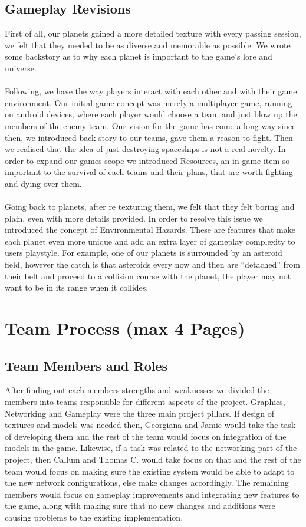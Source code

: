 \documentclass[11pt,a4paper]{article}
\begin{document}
        \subsection{Gameplay Revisions}
        First of all, our planets gained a more detailed texture with every passing session, we felt that they needed to be as diverse and memorable as possible. We wrote some backstory as to why each planet is important to the game's lore and universe. \\ \\ 
        Following, we have the way players interact with each other and with their game environment. Our initial game concept was merely a multiplayer game, running on android devices, where each player would choose a team and just blow up the members of the enemy team. Our vision for the game has come a long way since then, we introduced back story to our teams, gave them a reason to fight. Then we realised that the idea of just destroying spaceships is not a real novelty. In order to expand our games scope we introduced Resources, an in game item so important to the survival of each teams and their plans, that are worth fighting and dying over them. \\ \\
        Going back to planets, after re texturing them, we felt that they felt boring and plain, even with more details provided. In order to resolve this issue we introduced the concept of Environmental Hazards. These are features that make each planet even more unique and add an extra layer of gameplay complexity to users playstyle. For example, one of our planets is surrounded by an asteroid field, however the catch is that asteroids every now and then are “detached” from their belt and proceed to a collision course with the planet, the player may not want to be in its range when it collides.

        \section{Team Process (max 4 Pages)}
        
        \subsection{Team Members and Roles}

After finding out each members strengths and weaknesses we divided the members into teams responsible for different aspects of the project. Graphics, Networking and Gameplay were the three main project pillars. If design of textures and models was needed then, Georgiana and Jamie would take the task of developing them and the rest of the team would focus on integration of the models in the game. Likewise, if a task was related to the networking part of the project, then Callum and Thomas C. would take focus on that and the rest of the team would focus on making sure the existing system would be able to adapt to the new network configurations, else make changes accordingly. The remaining members would focus on gameplay improvements and integrating new features to the game, along with making sure that no new changes and additions were causing problems to the existing implementation.
         
\end{document}

